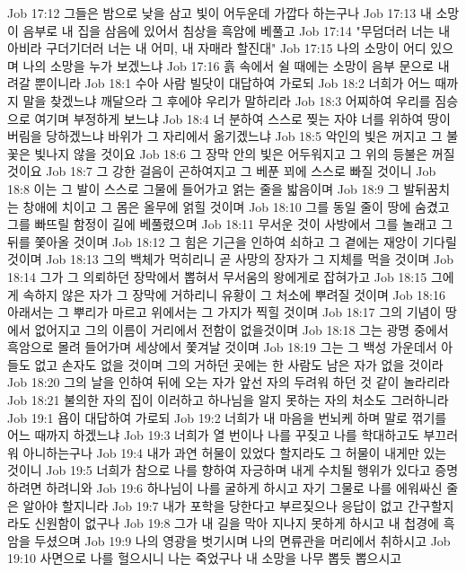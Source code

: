Job 17:12  그들은 밤으로 낮을 삼고 빛이 어두운데 가깝다 하는구나
Job 17:13  내 소망이 음부로 내 집을 삼음에 있어서 침상을 흑암에 베풀고
Job 17:14  "무덤더러 너는 내 아비라 구더기더러 너는 내 어미, 내 자매라 할진대"
Job 17:15  나의 소망이 어디 있으며 나의 소망을 누가 보겠느냐
Job 17:16  흙 속에서 쉴 때에는 소망이 음부 문으로 내려갈 뿐이니라
Job 18:1  수아 사람 빌닷이 대답하여 가로되
Job 18:2  너희가 어느 때까지 말을 찾겠느냐 깨달으라 그 후에야 우리가 말하리라
Job 18:3  어찌하여 우리를 짐승으로 여기며 부정하게 보느냐
Job 18:4  너 분하여 스스로 찢는 자야 너를 위하여 땅이 버림을 당하겠느냐 바위가 그 자리에서 옮기겠느냐
Job 18:5  악인의 빛은 꺼지고 그 불꽃은 빛나지 않을 것이요
Job 18:6  그 장막 안의 빛은 어두워지고 그 위의 등불은 꺼질 것이요
Job 18:7  그 강한 걸음이 곤하여지고 그 베푼 꾀에 스스로 빠질 것이니
Job 18:8  이는 그 발이 스스로 그물에 들어가고 얽는 줄을 밟음이며
Job 18:9  그 발뒤꿈치는 창애에 치이고 그 몸은 올무에 얽힐 것이며
Job 18:10  그를 동일 줄이 땅에 숨겼고 그를 빠뜨릴 함정이 길에 베풀렸으며
Job 18:11  무서운 것이 사방에서 그를 놀래고 그 뒤를 쫓아올 것이며
Job 18:12  그 힘은 기근을 인하여 쇠하고 그 곁에는 재앙이 기다릴 것이며
Job 18:13  그의 백체가 먹히리니 곧 사망의 장자가 그 지체를 먹을 것이며
Job 18:14  그가 그 의뢰하던 장막에서 뽑혀서 무서움의 왕에게로 잡혀가고
Job 18:15  그에게 속하지 않은 자가 그 장막에 거하리니 유황이 그 처소에 뿌려질 것이며
Job 18:16  아래서는 그 뿌리가 마르고 위에서는 그 가지가 찍힐 것이며
Job 18:17  그의 기념이 땅에서 없어지고 그의 이름이 거리에서 전함이 없을것이며
Job 18:18  그는 광명 중에서 흑암으로 몰려 들어가며 세상에서 쫓겨날 것이며
Job 18:19  그는 그 백성 가운데서 아들도 없고 손자도 없을 것이며 그의 거하던 곳에는 한 사람도 남은 자가 없을 것이라
Job 18:20  그의 날을 인하여 뒤에 오는 자가 앞선 자의 두려워 하던 것 같이 놀라리라
Job 18:21  불의한 자의 집이 이러하고 하나님을 알지 못하는 자의 처소도 그러하니라
Job 19:1  욥이 대답하여 가로되
Job 19:2  너희가 내 마음을 번뇌케 하며 말로 꺾기를 어느 때까지 하겠느냐
Job 19:3  너희가 열 번이나 나를 꾸짖고 나를 학대하고도 부끄러워 아니하는구나
Job 19:4  내가 과연 허물이 있었다 할지라도 그 허물이 내게만 있는 것이니
Job 19:5  너희가 참으로 나를 향하여 자긍하며 내게 수치될 행위가 있다고 증명하려면 하려니와
Job 19:6  하나님이 나를 굴하게 하시고 자기 그물로 나를 에워싸신 줄은 알아야 할지니라
Job 19:7  내가 포학을 당한다고 부르짖으나 응답이 없고 간구할지라도 신원함이 없구나
Job 19:8  그가 내 길을 막아 지나지 못하게 하시고 내 첩경에 흑암을 두셨으며
Job 19:9  나의 영광을 벗기시며 나의 면류관을 머리에서 취하시고
Job 19:10  사면으로 나를 헐으시니 나는 죽었구나 내 소망을 나무 뽑듯 뽑으시고
